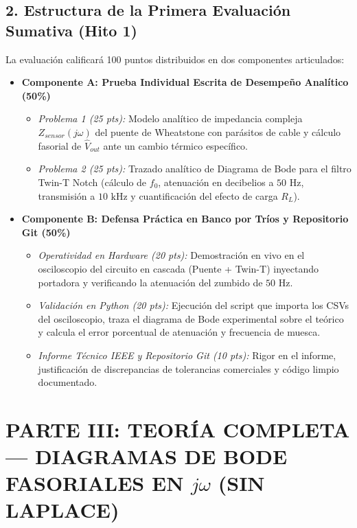 \documentclass[11pt,a4paper,twoside]{article}
\begin{document}
\subsection*{2. Estructura de la Primera Evaluación Sumativa (Hito 1)}
La evaluación calificará 100 puntos distribuidos en dos componentes articulados:
\begin{itemize}[itemsep=4pt]
    \item \textbf{Componente A: Prueba Individual Escrita de Desempeño Analítico (50\%)}
    \begin{itemize}[nosep]
        \item \textit{Problema 1 (25 pts):} Modelo analítico de impedancia compleja $Z_{sensor}(j\omega)$ del puente de Wheatstone con parásitos de cable y cálculo fasorial de $\hat{V}_{out}$ ante un cambio térmico específico.
        \item \textit{Problema 2 (25 pts):} Trazado analítico de Diagrama de Bode para el filtro Twin-T Notch (cálculo de $f_0$, atenuación en decibelios a $50\text{ Hz}$, transmisión a $10\text{ kHz}$ y cuantificación del efecto de carga $R_L$).
    \end{itemize}
    \item \textbf{Componente B: Defensa Práctica en Banco por Tríos y Repositorio Git (50\%)}
    \begin{itemize}[nosep]
        \item \textit{Operatividad en Hardware (20 pts):} Demostración en vivo en el osciloscopio del circuito en cascada (Puente + Twin-T) inyectando portadora y verificando la atenuación del zumbido de $50\text{ Hz}$.
        \item \textit{Validación en Python (20 pts):} Ejecución del script que importa los CSVs del osciloscopio, traza el diagrama de Bode experimental sobre el teórico y calcula el error porcentual de atenuación y frecuencia de muesca.
        \item \textit{Informe Técnico IEEE y Repositorio Git (10 pts):} Rigor en el informe, justificación de discrepancias de tolerancias comerciales y código limpio documentado.
    \end{itemize}
\end{itemize}

\newpage
\section{PARTE III: TEORÍA COMPLETA — DIAGRAMAS DE BODE FASORIALES EN \texorpdfstring{$j\omega$}{jw} (SIN LAPLACE)}
\end{document}
